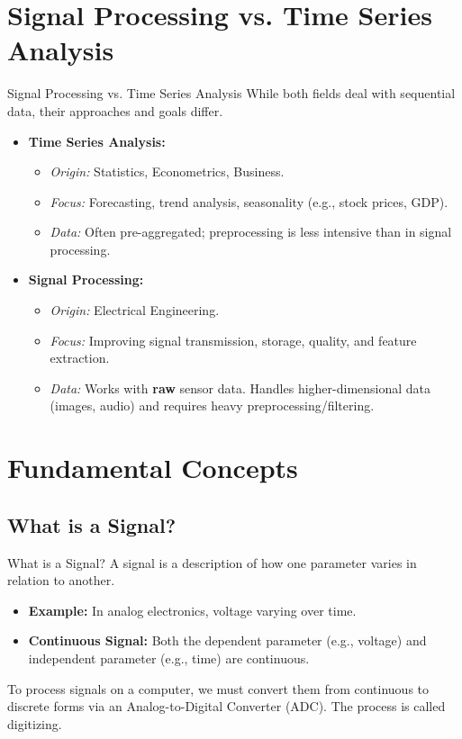 \documentclass[aspectratio=169]{beamer}
\begin{document}
\section{Signal Processing vs. Time Series Analysis}
\begin{frame}{Signal Processing vs. Time Series Analysis}
While both fields deal with sequential data, their approaches and goals differ.

\begin{itemize}
    \item \textbf{Time Series Analysis:}
    \begin{itemize}
        \item \textit{Origin:} Statistics, Econometrics, Business.
        \item \textit{Focus:} Forecasting, trend analysis, seasonality (e.g., stock prices, GDP).
        \item \textit{Data:} Often pre-aggregated; preprocessing is less intensive than in signal processing.
    \end{itemize}
    
    \item \textbf{Signal Processing:}
    \begin{itemize}
        \item \textit{Origin:} Electrical Engineering.
        \item \textit{Focus:} Improving signal transmission, storage, quality, and feature extraction.
        \item \textit{Data:} Works with \textbf{raw} sensor data. Handles higher-dimensional data (images, audio) and requires heavy preprocessing/filtering.
    \end{itemize}
\end{itemize}
\end{frame}

\section{Fundamental Concepts}

\subsection{What is a Signal?}
\begin{frame}{What is a Signal?}
A signal is a description of how one parameter varies in relation to another.
\begin{itemize}
    \item \textbf{Example:} In analog electronics, voltage varying over time.
    \item \textbf{Continuous Signal:} Both the dependent parameter (e.g., voltage) and independent parameter (e.g., time) are continuous.
\end{itemize}

To process signals on a computer, we must convert them from continuous to discrete forms via an Analog-to-Digital Converter (ADC). The process is called digitizing.

\end{frame}
\end{document}
